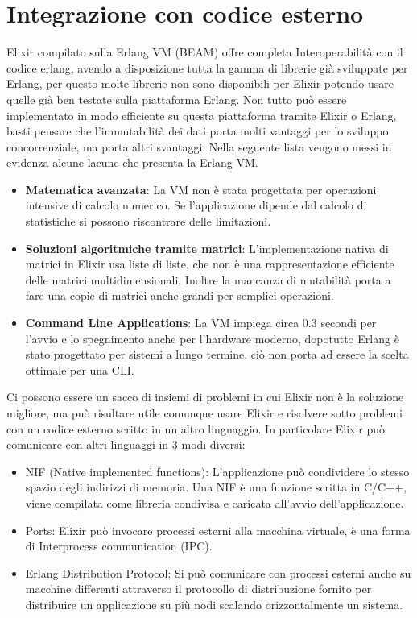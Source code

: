 \section{Integrazione con codice esterno}\label{subsec:mysubsection}
Elixir compilato sulla Erlang VM (BEAM) offre completa Interoperabilità
con il codice erlang, avendo a disposizione tutta la gamma di librerie
già sviluppate per Erlang, per questo molte librerie non sono disponibili
per Elixir potendo usare quelle già ben testate sulla piattaforma Erlang.
Non tutto può essere implementato in modo efficiente su questa piattaforma
tramite Elixir o Erlang, basti pensare che l'immutabilità dei dati
porta molti vantaggi per lo sviluppo concorrenziale, ma porta altri
svantaggi. Nella seguente lista vengono messi in evidenza alcune
lacune che presenta la Erlang VM.

\begin{itemize}
	\item \textbf{Matematica avanzata}: La VM non è stata progettata per operazioni
	intensive di calcolo numerico. Se l'applicazione dipende dal calcolo di
	statistiche si possono riscontrare delle limitazioni.
	\item \textbf{Soluzioni algoritmiche tramite matrici}: L'implementazione
	nativa di matrici in Elixir usa liste di liste, che non è una rappresentazione
	efficiente delle matrici multidimensionali. Inoltre la mancanza di mutabilità
	porta a fare una copie di matrici anche grandi per semplici operazioni.
	\item \textbf{Command Line Applications}: La VM impiega circa 0.3 secondi
	per l'avvio e lo spegnimento anche per l'hardware moderno, dopotutto Erlang
	è stato progettato per sistemi a lungo termine, ciò non porta ad essere
	la scelta ottimale per una CLI.
\end{itemize}

Ci possono essere un sacco di insiemi di problemi in cui Elixir
non è la soluzione migliore, ma può risultare utile comunque
usare Elixir e risolvere sotto problemi con un codice esterno
scritto in un altro linguaggio.
In particolare Elixir può comunicare con altri linguaggi
in 3 modi diversi:

\begin{itemize}
	\item NIF (Native implemented functions): L'applicazione può condividere lo stesso
	spazio degli indirizzi di memoria.
	Una NIF è una funzione scritta in C/C++, viene compilata
	come libreria condivisa e caricata all'avvio dell'applicazione.
	\item Ports: Elixir può invocare processi esterni alla macchina
	virtuale, è una forma di Interprocess communication (IPC).
	\item Erlang Distribution Protocol: Si può comunicare con
	processi esterni anche su macchine differenti
	attraverso il protocollo di distribuzione fornito per distribuire
	un applicazione su più nodi scalando orizzontalmente un sistema.
\end{itemize}


